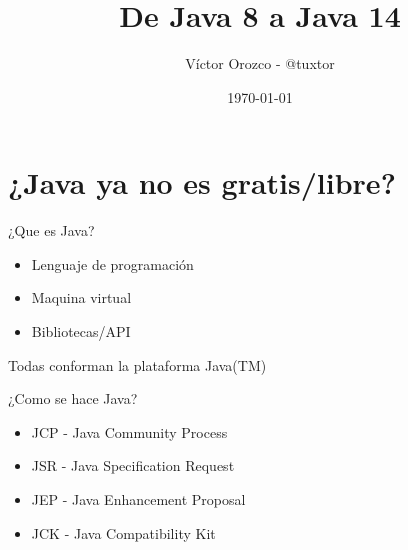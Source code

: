 \documentclass[aspectratio=169]{beamer}
\title{De Java 8 a Java 14}
\author{Víctor Orozco - @tuxtor}
\institute{GuateJUG}
\date{\today}
\begin{document}
{
    \frame{\titlepage}
}



\section{¿Java ya no es gratis/libre?}

\begin{frame}[fragile]{¿Que es Java?}
	\begin{itemize}
		\item Lenguaje de programación
		\item Maquina virtual
		\item Bibliotecas/API
	\end{itemize}

Todas conforman la plataforma Java(TM)
	
\end{frame}

\begin{frame}[fragile]{¿Como se hace Java?}
	\begin{itemize}
		\item JCP - Java Community Process
		\item JSR - Java Specification Request
		\item JEP - Java Enhancement Proposal
		\item JCK - Java Compatibility Kit
	\end{itemize}	
\end{frame}
\end{document}
